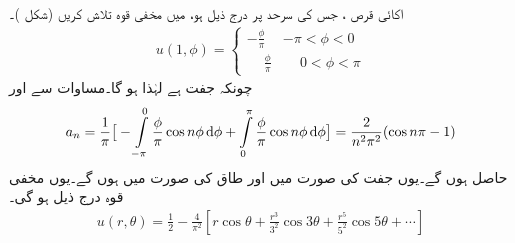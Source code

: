 \quad {}\\
اکائی قرص ، جس کی سرحد پر درج ذیل ہو، میں مخفی قوہ  تلاش کریں (شکل )۔
\begin{align*}
u(1,\phi)=
\begin{cases}
-\frac{\phi}{\pi}& -\pi<\phi<0\\[0.5ex]
\phantom{-}\frac{\phi}{\pi}& \phantom{-}0<\phi<\pi
\end{cases}
\end{align*}
چونکہ   جفت ہے لہٰذا  ہو گا۔مساوات  سے  اور
\begin{align*}
a_n=\frac{1}{\pi}\big[-\int\limits_{-\pi}^{0}\frac{\phi}{\pi}\cos n\phi \dif \phi+\int\limits_{0}^{\pi}\frac{\phi}{\pi}\cos n\phi \dif \phi\big]=\frac{2}{n^2\pi^2}(\cos n\pi-1)
\end{align*}
حاصل ہوں گے۔یوں جفت  کی صورت میں  اور طاق  کی صورت میں  ہوں گے۔یوں مخفی قوہ درج ذیل ہو گی۔
\begin{align*}
u(r,\theta)=\frac{1}{2}-\frac{4}{\pi^2}[r\cos\theta+\frac{r^3}{3^2}\cos 3\theta+\frac{r^5}{5^2}\cos 5\theta+\cdots]
\end{align*} 
%
